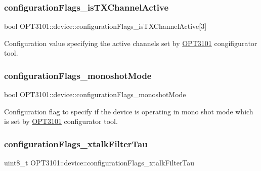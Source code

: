 \subsubsection{\texorpdfstring{configuration\+Flags\+\_\+is\+T\+X\+Channel\+Active}{configurationFlags\_isTXChannelActive}}
{\footnotesize\ttfamily bool O\+P\+T3101\+::device\+::configuration\+Flags\+\_\+is\+T\+X\+Channel\+Active\mbox{[}3\mbox{]}}



Configuration value specifying the active channels set by \mbox{\hyperlink{namespace_o_p_t3101}{O\+P\+T3101}} congifigurator tool. 

\mbox{\label{class_o_p_t3101_1_1device_a5ddd31b24f0caf9335ec8f8cc50584b2}} 
\subsubsection{\texorpdfstring{configuration\+Flags\+\_\+monoshot\+Mode}{configurationFlags\_monoshotMode}}
{\footnotesize\ttfamily bool O\+P\+T3101\+::device\+::configuration\+Flags\+\_\+monoshot\+Mode}



Configuration flag to specify if the device is operating in mono shot mode which is set by \mbox{\hyperlink{namespace_o_p_t3101}{O\+P\+T3101}} configurator tool. 

\mbox{\label{class_o_p_t3101_1_1device_a93f398cf6cf57975f673afbab7ba9603}} 
\subsubsection{\texorpdfstring{configuration\+Flags\+\_\+xtalk\+Filter\+Tau}{configurationFlags\_xtalkFilterTau}}
{\footnotesize\ttfamily uint8\+\_\+t O\+P\+T3101\+::device\+::configuration\+Flags\+\_\+xtalk\+Filter\+Tau}



